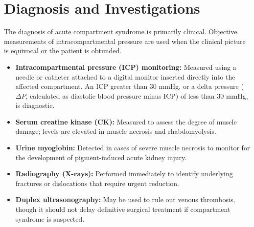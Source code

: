 \section*{Diagnosis and Investigations}
The diagnosis of acute compartment syndrome is primarily clinical. Objective measurements of intracompartmental pressure are used when the clinical picture is equivocal or the patient is obtunded.
\begin{itemize}
    \item \textbf{Intracompartmental pressure (ICP) monitoring:} Measured using a needle or catheter attached to a digital monitor inserted directly into the affected compartment. An ICP greater than 30 mmHg, or a delta pressure ($\Delta P$, calculated as diastolic blood pressure minus ICP) of less than 30 mmHg, is diagnostic.
    \item \textbf{Serum creatine kinase (CK):} Measured to assess the degree of muscle damage; levels are elevated in muscle necrosis and rhabdomyolysis.
    \item \textbf{Urine myoglobin:} Detected in cases of severe muscle necrosis to monitor for the development of pigment-induced acute kidney injury.
    \item \textbf{Radiography (X-rays):} Performed immediately to identify underlying fractures or dislocations that require urgent reduction.
    \item \textbf{Duplex ultrasonography:} May be used to rule out venous thrombosis, though it should not delay definitive surgical treatment if compartment syndrome is suspected.
\end{itemize}

